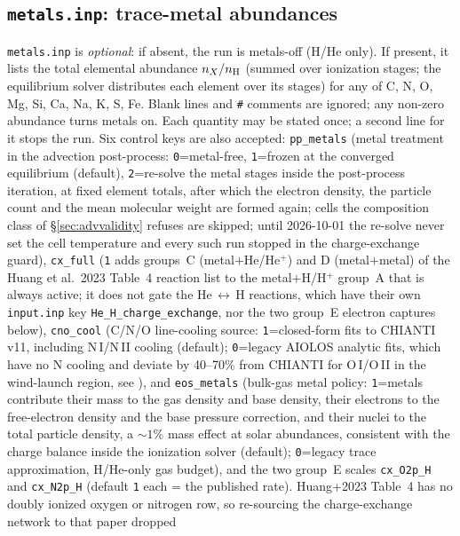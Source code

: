 \documentclass[english,a4paper]{my_memo}
\begin{document}
\subsection{\texttt{metals.inp}: trace-metal abundances}
\texttt{metals.inp} is \emph{optional}: if absent, the run is metals-off (H/He
only). If present, it lists the total elemental abundance $n_X/n_{\rm H}$ (summed
over ionization stages; the equilibrium solver distributes each element over its
stages) for any of C, N, O, Mg, Si, Ca, Na, K, S, Fe. Blank lines and \texttt{\#}
comments are ignored; any non-zero abundance turns metals on. Each quantity
may be stated once; a second line for it stops the run. Six control keys
are also accepted: \texttt{pp\_metals} (metal treatment in the advection
post-process: \texttt{0}=metal-free, \texttt{1}=frozen at the converged
equilibrium (default), \texttt{2}=re-solve the metal stages inside the post-process
iteration, at fixed element totals, after which the electron density, the
particle count and the mean molecular weight are formed again; cells the
composition class of \S\ref{sec:advvalidity} refuses are skipped; until
2026-10-01 the re-solve never set the cell temperature and every such run
stopped in the charge-exchange guard),
\texttt{cx\_full} (\texttt{1} adds groups~C (metal$+$He/He$^+$) and D
(metal$+$metal) of the Huang et al.\ 2023 Table~4 reaction list to the
metal$+$H/H$^+$ group~A that is always active; it does not gate the
He\,$\leftrightarrow$\,H reactions, which have their own \texttt{input.inp} key
\texttt{He\_H\_charge\_exchange}, nor the two group~E electron captures
below), \texttt{cno\_cool} (C/N/O line-cooling source:
\texttt{1}=closed-form fits to CHIANTI v11, including N\,I/N\,II cooling
(default); \texttt{0}=legacy AIOLOS analytic fits, which have no N cooling and
deviate by 40--70\% from CHIANTI for O\,I/O\,II in the wind-launch region,
see ), and
\texttt{eos\_metals} (bulk-gas metal policy: \texttt{1}=metals contribute
their mass to the gas density and base density, their electrons to the
free-electron density and the base pressure correction, and their nuclei to
the total particle density, a ${\sim}1\%$ mass effect at solar abundances,
consistent with the charge balance inside the ionization solver (default);
\texttt{0}=legacy trace approximation, H/He-only gas budget), and the two
group~E scales \texttt{cx\_O2p\_H} and \texttt{cx\_N2p\_H} (default \texttt{1}
each = the published rate).
Huang+2023 Table~4 has no doubly ionized oxygen or nitrogen row, so
re-sourcing the charge-exchange network to that paper dropped
\end{document}
